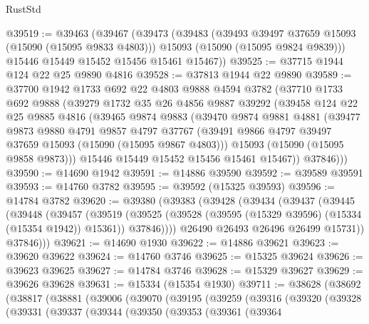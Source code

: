 \begin{lexlean}{RustStd}
\begin{coremodule}
@39519 := @39463
    (@39467
      (@39473
        (@39483
          (@39493 @39497 @37659 @15093 (@15090 (@15095 @9833 @4803)))
          @15093
          (@15090 (@15095 @9824 @9839)))
        @15446
        @15449
        @15452
        @15456
        @15461
        @15467))
@39525 := @37715 @1944 @124 @22 @25 @9890 @4816
@39528 := @37813 @1944 @22 @9890
@39589 := @37700
    @1942
    @1733
    @692
    @22
    @4803
    @9888
    @4594
    @3782
    (@37710
      @1733
      @692
      @9888
      (@39279
        @1732
        @35
        @26
        @4856
        @9887
        @39292
        (@39458
          @124
          @22
          @25
          @9885
          @4816
          (@39465
            @9874
            @9883
            (@39470
              @9874
              @9881
              @4881
              (@39477
                @9873
                @9880
                @4791
                @9857
                @4797
                @37767
                (@39491 @9866 @4797 @39497 @37659 @15093 (@15090 (@15095 @9867 @4803)))
                @15093
                (@15090 (@15095 @9858 @9873)))
              @15446
              @15449
              @15452
              @15456
              @15461
              @15467))
          @37846)))
@39590 := @14690 @1942
@39591 := @14886 @39590
@39592 := @39589 @39591
@39593 := @14760 @3782
@39595 := @39592 (@15325 @39593)
@39596 := @14784 @3782
@39620 := @39380
    (@39383
      (@39428
        (@39434
          (@39437
            (@39445
              (@39448
                (@39457
                  (@39519
                    (@39525
                      (@39528 (@39595 (@15329 @39596) (@15334 (@15354 @1942)) @15361))
                      @37846))))
              @26490
              @26493
              @26496
              @26499
              @15731))
          @37846)))
@39621 := @14690 @1930
@39622 := @14886 @39621
@39623 := @39620 @39622
@39624 := @14760 @3746
@39625 := @15325 @39624
@39626 := @39623 @39625
@39627 := @14784 @3746
@39628 := @15329 @39627
@39629 := @39626 @39628
@39631 := @15334 (@15354 @1930)
@39711 := @38628
    (@38692
      (@38817
        (@38881
          (@39006
            (@39070
              (@39195
                (@39259
                  (@39316
                    (@39320
                      (@39328
                        (@39331
                          (@39337
                            (@39344
                              (@39350
                                (@39353
                                  (@39361
                                    (@39364

\end{coremodule}
\end{lexlean}
